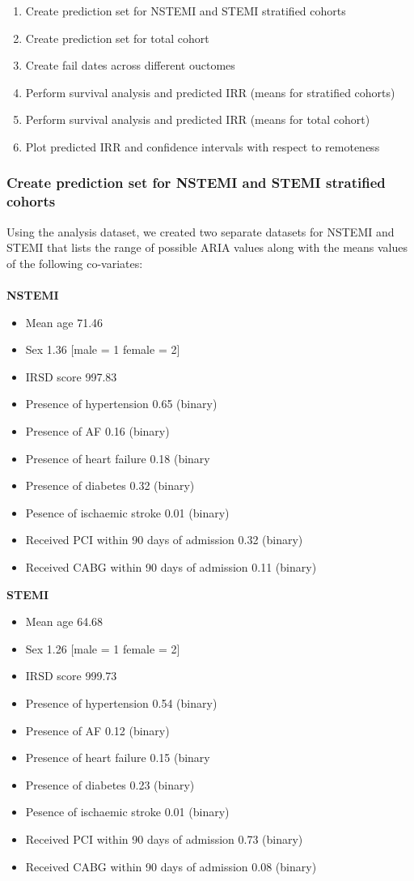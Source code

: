 \documentclass[11pt]{article}
\begin{document}
\begin{enumerate}
\item Create prediction set for NSTEMI and STEMI stratified cohorts
\item Create prediction set for total cohort
\item Create fail dates across different ouctomes
\item Perform survival analysis and predicted IRR (means for stratified cohorts)
\item Perform survival analysis and predicted IRR (means for total cohort)
\item Plot predicted IRR and confidence intervals with respect to remoteness
\end{enumerate}

\subsubsection{Create prediction set for NSTEMI and STEMI stratified cohorts}

Using the analysis dataset, we created two separate datasets for NSTEMI and STEMI that lists the range of possible ARIA values along with the means values of the following co-variates:\\~\\ 
\textbf{NSTEMI}
\begin{itemize}
\item Mean age 71.46
\item Sex 1.36 [male = 1 female = 2]
\item IRSD score 997.83
\item Presence of hypertension 0.65 (binary)
\item Presence of AF 0.16 (binary)
\item Presence of heart failure 0.18 (binary
\item Presence of diabetes 0.32 (binary)
\item Pesence of ischaemic stroke 0.01 (binary)
\item Received PCI within 90 days of admission 0.32 (binary)
\item Received CABG within 90 days of admission 0.11 (binary)
\end{itemize}

\textbf{STEMI}
\begin{itemize}
\item Mean age 64.68
\item Sex 1.26 [male = 1 female = 2]
\item IRSD score 999.73
\item Presence of hypertension 0.54 (binary)
\item Presence of AF 0.12 (binary)
\item Presence of heart failure 0.15 (binary
\item Presence of diabetes 0.23 (binary)
\item Pesence of ischaemic stroke 0.01 (binary)
\item Received PCI within 90 days of admission 0.73 (binary)
\item Received CABG within 90 days of admission 0.08 (binary)
\end{itemize}
\end{document}
